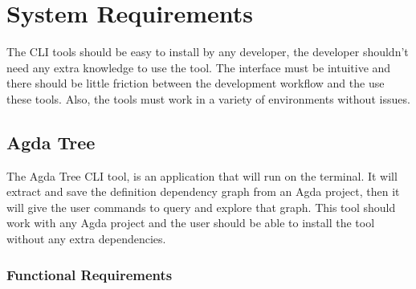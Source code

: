 
\chapter{System Requirements}

The CLI tools should be easy to install by any developer, the developer
shouldn't need any extra knowledge to use the tool. The interface must be
intuitive and there should be little friction between the development workflow
and the use these tools. Also, the tools must work in a variety of environments
without issues.


\section{Agda Tree}

The Agda Tree CLI tool, is an application that will run on the terminal. It
will extract and save the definition dependency graph from an Agda project,
then it will give the user commands to query and explore that graph. This tool
should work with any Agda project and the user should be able to install the
tool without any extra dependencies.


\subsection{Functional Requirements}

